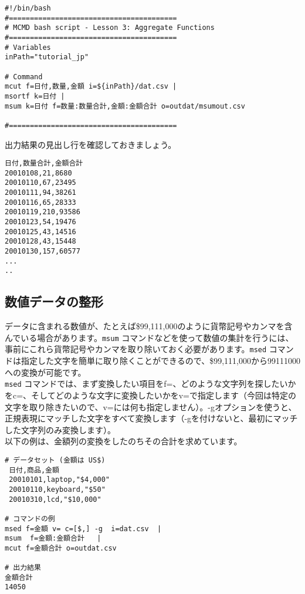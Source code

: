 \begin{verbatim}
#!/bin/bash
#========================================
# MCMD bash script - Lesson 3: Aggregate Functions
#========================================
# Variables
inPath="tutorial_jp"

# Command 
mcut f=日付,数量,金額 i=${inPath}/dat.csv |
msortf k=日付 |
msum k=日付 f=数量:数量合計,金額:金額合計 o=outdat/msumout.csv

#========================================
\end{verbatim}

出力結果の見出し行を確認しておきましょう。

\begin{verbatim}
日付,数量合計,金額合計
20010108,21,8680
20010110,67,23495
20010111,94,38261
20010116,65,28333
20010119,210,93586
20010123,54,19476
20010125,43,14516
20010128,43,15448
20010130,157,60577
...
..
\end{verbatim}

\subsection{数値データの整形} 
    
データに含まれる数値が、たとえば\$99,111,000のように貨幣記号やカンマを含んでいる場合があります。\verb|msum| コマンドなどを使って数値の集計を行うには、事前にこれら貨幣記号やカンマを取り除いておく必要があります。\verb|msed| コマンドは指定した文字を簡単に取り除くことができるので、\$99,111,000から99111000への変換が可能です。\\

\verb|msed| コマンドでは、まず変換したい項目をf=、どのような文字列を探したいかをc=、そしてどのような文字に変換したいかをv=で指定します（今回は特定の文字を取り除きたいので、v=には何も指定しません）。-gオプションを使うと、正規表現にマッチした文字をすべて変換します（-gを付けないと、最初にマッチした文字列のみ変換します）。\\

以下の例は、金額列の変換をしたのちその合計を求めています。\\

 \begin{verbatim}
# データセット (金額は US$)
 日付,商品,金額
 20010101,laptop,"$4,000"
 20010110,keyboard,"$50"
 20010310,lcd,"$10,000"
 
# コマンドの例
msed f=金額 v= c=[$,] -g  i=dat.csv  |
msum  f=金額:金額合計   |
mcut f=金額合計 o=outdat.csv

# 出力結果
金額合計
14050
 \end{verbatim}

